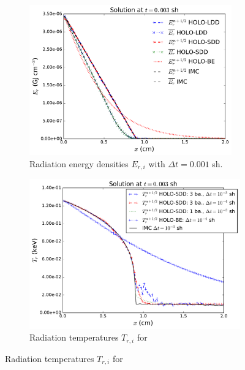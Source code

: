 \documentclass{anstrans}
\begin{document}
\begin{figure}[bth!]
\centering
\begin{subfigure}{0.48\textwidth}
  \centering
  \vspace{-0.051in}
    \captionsetup{justification=centering,margin=1.5cm}
    \includegraphics[width=0.96\textwidth]{void_imc_compare.pdf}
    \caption{\label{fig:void_imc_compare} Radiation energy densities $E_{r,i}$  with
    $\Delta t=0.001$ sh.}
\end{subfigure}
\begin{subfigure}{0.48\textwidth}
  \centering
    \captionsetup{justification=centering,margin=1.0cm}
    \includegraphics[width=\textwidth]{void_temp_batch_compare.pdf}
    \caption{\hspace{0.1in}\label{fig:void_temp_compare} Radiation temperatures $T_{r,i}$ for
}
\end{subfigure}
\end{figure}
\end{document}
